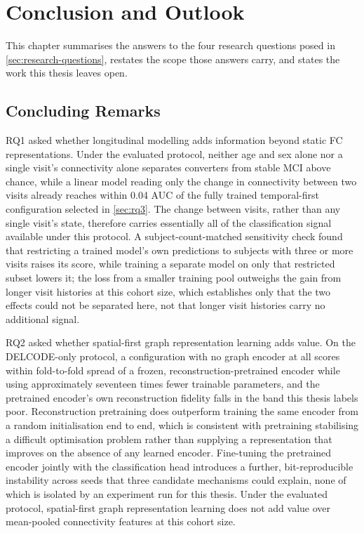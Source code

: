 
\chapter{Conclusion and Outlook}\label{ch:conclusion}

This chapter summarises the answers to the four research questions posed in
\autoref{sec:research-questions}, restates the scope those answers carry, and states the
work this thesis leaves open.

\section{Concluding Remarks}\label{sec:concluding-remarks}

RQ1 asked whether longitudinal modelling adds information beyond static \ac{FC}
representations. Under the evaluated protocol, neither age and sex alone nor a single
visit's connectivity alone separates converters from stable \ac{MCI} above chance, while a
linear model reading only the change in connectivity between two visits already reaches
within 0.04 \ac{AUC} of the fully trained temporal-first configuration selected in
\autoref{sec:rq3}. The change between visits, rather than any single visit's state,
therefore carries essentially all of the classification signal available under this
protocol. A subject-count-matched sensitivity check found that restricting a trained
model's own predictions to subjects with three or more visits raises its score, while
training a separate model on only that restricted subset lowers it; the loss from a
smaller training pool outweighs the gain from longer visit histories at this cohort size,
which establishes only that the two effects could not be separated here, not that longer
visit histories carry no additional signal.

RQ2 asked whether spatial-first graph representation learning adds value. On the
\ac{DELCODE}-only protocol, a configuration with no graph encoder at all scores within
fold-to-fold spread of a frozen, reconstruction-pretrained encoder while using
approximately seventeen times fewer trainable parameters, and the pretrained encoder's own
reconstruction fidelity falls in the band this thesis labels poor. Reconstruction
pretraining does outperform training the same encoder from a random initialisation end to
end, which is consistent with pretraining stabilising a difficult optimisation problem
rather than supplying a representation that improves on the absence of any learned
encoder. Fine-tuning the pretrained encoder jointly with the classification head introduces
a further, bit-reproducible instability across seeds that three candidate mechanisms could
explain, none of which is isolated by an experiment run for this thesis. Under the
evaluated protocol, spatial-first graph representation learning does not add value over
mean-pooled connectivity features at this cohort size.

